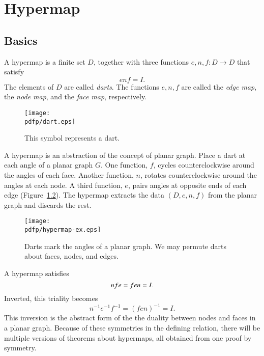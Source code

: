 
\def\e{\varepsilonup}
\def\ocirc{}
\chapter{Hypermap}\label{chap:hypermap}

\section{Basics}



\begin{definition}[hypermap]\label{def:hypermap}  A hypermap is a finite set $D$, together with
three functions $e,n,f:D\to D$ that satisfy
    $$e\ocirc n\ocirc f = I.$$
The elements of $D$ are called {\it darts}.  The functions $e,n,f$
are called the {\it edge map}, the {\it node map}, and the {\it
face map}, respectively.
\end{definition}

\begin{figure}[htb]
  \centering
  \texttt{[image: \\pdfp/dart.eps]}
  \caption{This symbol represents a dart.}
  \label{fig:dart}
\end{figure}

\begin{remark} A hypermap is an abstraction of
the concept of 
planar graph.  Place a dart at each angle of a planar graph $G$.
One function, $f$, 
cycles counterclockwise around the angles of each face.  
Another function, $n$, 
rotates counterclockwise around the angles at each
node.  A third function, $e$, pairs angles at opposite ends of
each edge  (Figure~\ref{fig:hypermap_ex}).   The hypermap extracts
the data $(D,e,n,f)$ from the planar graph and discards the rest.
\end{remark}

\begin{figure}[htb]
  \centering
  \texttt{[image: \\pdfp/hypermap-ex.eps]}
  \caption{Darts mark the angles of a planar graph.  We may
  permute darts about faces, nodes, and edges.}
  \label{fig:hypermap_ex}
\end{figure}

A hypermap satisfies 
  \begin{equation}\tlabel{eqn:triality}
  n\ocirc f\ocirc e = f\ocirc e\ocirc n = I.
  \end{equation}
Inverted, this triality becomes
   $$
   n^{-1} \ocirc e^{-1} \ocirc f^{-1} = (f \ocirc e \ocirc n)^{-1} = I.
   $$
This inversion is the abstract form of the the duality between nodes and faces in a planar graph.  Because of these symmetries in the defining relation, there will be multiple versions of theorems about hypermaps, all obtained from one proof by symmetry.

